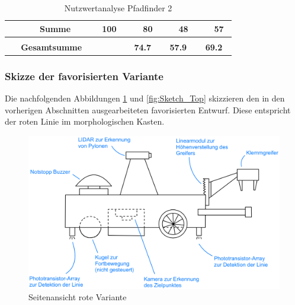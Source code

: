 \documentclass[main.tex]{subfiles} %
\begin{document}
\begin{landscape}
\begin{table}[ht]
\begin{tabular}{|p{0.11\linewidth}|p{0.18\linewidth}|p{0.085\linewidth}|p{0.057\linewidth}|p{0.07\linewidth}|p{0.057\linewidth}|p{0.07\linewidth}|p{0.057\linewidth}|p{0.07\linewidth}|}
                                                           & \textbf{Summe}                      & \textbf{100}                               &                                             & \textbf{80}                                 &   & \textbf{48}   &   & \textbf{57} \\[1pt]
            \hline
            \hline
            \multicolumn{2}{|c|}{}                         &                                     & \multicolumn{2}{c|}{}                      & \multicolumn{2}{c|}{}                       & \multicolumn{2}{c|}{}                                                             \\[-9pt]
            \multicolumn{2}{|c|}{\textbf{Gesamtsumme}}     &                                     & \multicolumn{2}{c|}{\textbf{74.7}}         & \multicolumn{2}{c|}{\textbf{57.9}}          & \multicolumn{2}{c|}{\textbf{69.2}}                                                \\[1pt]
            \hline
        \end{tabular}
        \caption{Nutzwertanalyse Pfadfinder 2}
    \end{table}

    \newpage

    \subsubsection{Skizze der favorisierten Variante}

    Die nachfolgenden Abbildungen \ref{fig:Sketch_Side} und \ref{fig:Sketch_Top}
    skizzieren den in den vorherigen Abschnitten ausgearbeiteten favorisierten Entwurf. Diese entspricht 
    der roten Linie im morphologischen Kasten. 

    \begin{figure}[h] %
        \centering %
        \includegraphics[width=1\textwidth]{./Skizzen/Sketch_Side.png} %
        \caption{Seitenansicht rote Variante} %
        \label{fig:Sketch_Side} %
    \end{figure}


\end{landscape}
\end{document}
